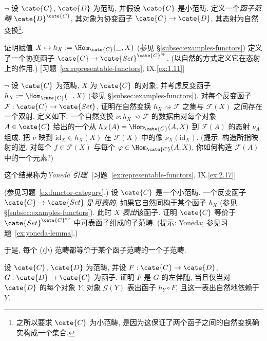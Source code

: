 \begin{prob}\label{ex:functor-category}
$\neg$ 设 $\cate{C}$, $\cate{D}$ 为范畴, 并假设 $\cate{C}$ 是小范畴. 定义一个\emph{函子范畴} $\cate{D}^{\cate{C}}$, 其对象为协变函子 $\cate{C}\to\cate{D}$, 其态射为自然变换\footnote{之所以要求 $\cate{C}$ 为小范畴, 是因为这保证了两个函子之间的自然变换确实构成一个集合.}.

证明赋值 $X\mapsto h_X:=\Hom_{\cate{C}}(\_,X)$ (参见 §\ref{subsec:examples-functors}) 定义了一个协变函子 $\cate{C}\to\cate{Set}^{\cate{C}^{\mathrm{op}}}$. (以自然的方式定义它在态射上的作用.) [习题~\ref{ex:representable-functors}, IX.\ref{ex:1.11}]
\end{prob}

\begin{prob}\label{ex:yoneda-lemma}
$\neg$ 设 $\cate{C}$ 为范畴, $X$ 为 $\cate{C}$ 的对象, 并考虑反变函子 $h_X:=\Hom_{\cate{C}}(\_,X)$ (参见 §\ref{subsec:examples-functors}). 对每个反变函子 $\mathcal{F}:\cate{C}\to\cate{Set}$, 证明在自然变换 $h_X\rightsquigarrow\mathcal{F}$ 之集与 $\mathcal{F}(X)$ 之间存在一个双射, 定义如下. 一个自然变换 $\nu:h_X\rightsquigarrow\mathcal{F}$ 的数据由对每个对象 $A\in\cate{C}$ 给出的一个从 $h_X(A)=\Hom_{\cate{C}}(A,X)$ 到 $\mathcal{F}(A)$ 的态射 $\nu_A$ 组成. 把 $\nu$ 映到 $\mathrm{id}_X\in h_X(X)$ 在 $\mathcal{F}(X)$ 中的像 $\nu_X(\mathrm{id}_X)$. (提示: 构造所指映射的逆. 对每个 $f\in\mathcal{F}(X)$ 与每个 $\varphi\in\Hom_{\cate{C}}(A,X)$, 你如何构造 $\mathcal{F}(A)$ 中的一个元素?)

这个结果称为\emph{Yoneda 引理}. [习题~\ref{ex:representable-functors}, IX.\ref{ex:2.17}]
\end{prob}

\begin{prob}\label{ex:representable-functors}
(参见习题~\ref{ex:functor-category}.) 设 $\cate{C}$ 是一个小范畴. 一个反变函子 $\cate{C}\to\cate{Set}$ 是\emph{可表的}, 如果它自然同构于某个函子 $h_X$ (参见 §\ref{subsec:examples-functors}). 此时 $X$ \emph{表出}该函子. 证明 $\cate{C}$ 等价于 $\cate{Set}^{\cate{C}^{\mathrm{op}}}$ 中可表函子组成的子范畴. (提示: Yoneda; 参见习题~\ref{ex:yoneda-lemma}.)

于是, 每个 (小) 范畴都等价于某个函子范畴的一个子范畴.
\end{prob}

\begin{prob}\label{ex:adjunction-represent}
设 $\cate{C}$, $\cate{D}$ 为范畴, 并设 $F:\cate{C}\to\cate{D}$, $G:\cate{D}\to\cate{C}$ 为函子. 证明 $F$ 是 $G$ 的左伴随, 当且仅当对 $\cate{D}$ 的每个对象 $Y$, 对象 $\mathcal{G}(Y)$ 表出函子 $h_Y\circ F$, 且这一表出自然地依赖于 $Y$.
\end{prob}

